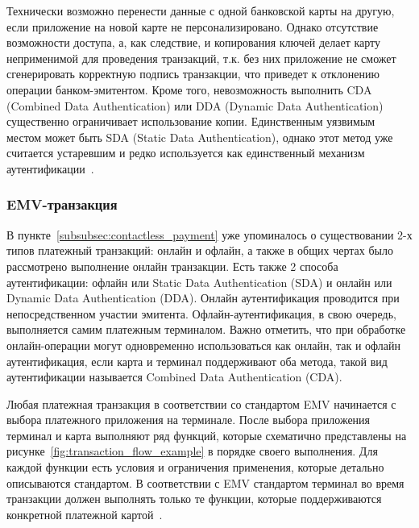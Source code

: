 Технически возможно перенести данные с одной банковской карты на другую, если приложение на новой карте не персонализировано.
Однако отсутствие возможности доступа, а, как следствие, и копирования ключей делает карту неприменимой для проведения транзакций, т.к. без них приложение не сможет сгенерировать корректную подпись транзакции, что приведет к отклонению операции банком-эмитентом.
Кроме того, невозможность выполнить CDA (Combined Data Authentication) или DDA (Dynamic Data Authentication) существенно ограничивает использование копии.
Единственным уязвимым местом может быть SDA (Static Data Authentication), однако этот метод уже считается устаревшим и редко используется как единственный механизм аутентификации~\cite{emv_card_mechanism}.

\subsubsection{EMV-транзакция}
\label{subsubsec:emv_transaction}

В пункте~\ref{subsubsec:contactless_payment} уже упоминалось о существовании 2-х типов платежный транзакций: онлайн и офлайн, а также в общих чертах было рассмотрено выполнение онлайн транзакции.
Есть также 2 способа аутентификации: офлайн или Static Data Authentication (SDA) и онлайн или Dynamic Data Authentication (DDA).
Онлайн аутентификация проводится при непосредственном участии эмитента.
Офлайн-аутентификация, в свою очередь, выполняется самим платежным терминалом.
Важно отметить, что при обработке онлайн-операции могут одновременно использоваться как онлайн, так и офлайн аутентификация, если карта и терминал поддерживают оба метода, такой вид аутентификации называется Combined Data Authentication (CDA).

Любая платежная транзакция в соответствии со стандартом EMV начинается с выбора платежного приложения на терминале.
После выбора приложения терминал и карта выполняют ряд функций, которые схематично представлены на рисунке~\ref{fig:transaction_flow_example} в порядке своего выполнения.
Для каждой функции есть условия и ограничения применения, которые детально описываются стандартом.
В соответствии с EMV стандартом терминал во время транзакции должен выполнять только те функции, которые поддерживаются конкретной платежной картой~\cite{emv_book_3}.


